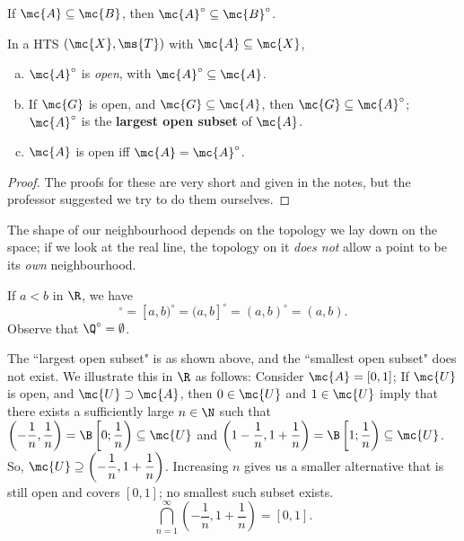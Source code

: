 \begin{note}
	If \(\mc{A}\subseteq\mc{B}\), then \(\mc{A}^{\circ}\subseteq\mc{B}^{\circ}\).
\end{note}
\begin{nproposition}{}
	In a HTS \((\mc{X},\ms{T})\) with \(\mc{A}\subseteq\mc{X}\),
	\begin{enumerate}[(a)]
		\item \(\mc{A}^{\circ}\) is \emph{open}, with \(\mc{A}^{\circ}\subseteq\mc{A}\).
		
		\item If \(\mc{G}\) is open, and \(\mc{G}\subseteq\mc{A}\), then \(\mc{G}\subseteq\mc{A}^{\circ}\); \(\mc{A}^{\circ}\) is the \textbf{largest open subset} of \(\mc{A}\).
		
		\item \(\mc{A}\) is open iff \(\mc{A}=\mc{A}^{\circ}\).
	\end{enumerate}
\end{nproposition}
\begin{proof}
	The proofs for these are very short and given in the notes, but the professor suggested we try to do them ourselves.
\end{proof}
\begin{note}
	The shape of our neighbourhood depends on the topology we lay down on the space; if we look at the real line, the topology on it \emph{does not} allow a point to be its \emph{own} neighbourhood.
\end{note}
\begin{example}
	If \(a<b\) in \(\R\), we have 
	\begin{equation*}
		[a,b]^{\circ}=[a,b)^{\circ}=(a,b]^{\circ}=(a,b)^{\circ}=(a,b).
	\end{equation*}
	Observe that \(\Q^{\circ}=\emptyset\).
\end{example}
\begin{note}
	The ``largest open subset" is as shown above, and the ``smallest open subset" does not exist. We illustrate this in \(\R\) as follows: Consider \(\mc{A}=[0,1]\); If \(\mc{U}\) is open, and \(\mc{U}\supset\mc{A}\), then \(0\in\mc{U}\) and \(1\in\mc{U}\) imply that there exists a sufficiently large \(n\in\N\) such that \(\left(-\displaystyle\frac{1}{n},\frac{1}{n}\right)=\displaystyle\B\left[0;\frac{1}{n}\right)\subseteq\mc{U}\) and \(\left(1-\displaystyle\frac{1}{n},1+\frac{1}{n}\right)=\displaystyle\B\left[1;\frac{1}{n}\right)\subseteq\mc{U}\). So, \(\mc{U}\supseteq\left(\displaystyle-\frac{1}{n},1+\displaystyle\frac{1}{n}\right)\). Increasing \(n\) gives us a smaller alternative that is still open and covers \([0,1]\); no smallest such subset exists.
	\begin{equation*}
		\bigcap_{n=1}^{\infty}\left(-\frac{1}{n},1+\frac{1}{n}\right)=[0,1].
	\end{equation*}
\end{note}

